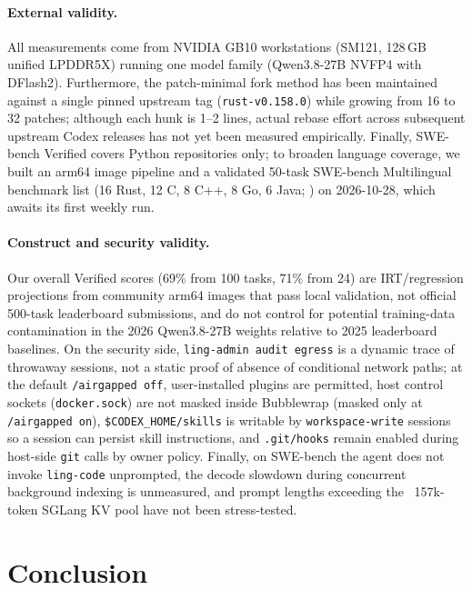 \documentclass[11pt]{article}
\newcommand{\code}[1]{\texttt{#1}}
\begin{document}
\paragraph{External validity.}
All measurements come from NVIDIA GB10 workstations (SM121, 128\,GB unified LPDDR5X) running one
model family (Qwen3.8-27B NVFP4 with DFlash2). Furthermore, the patch-minimal fork method has been
maintained against a single pinned upstream tag (\code{rust-v0.158.0}) while growing from 16 to 32
patches; although each hunk is 1--2 lines, actual rebase effort across subsequent upstream Codex
releases has not yet been measured empirically. Finally, SWE-bench Verified covers Python
repositories only; to broaden language coverage, we built an arm64 image pipeline and a validated
50-task SWE-bench Multilingual benchmark list (16 Rust, 12 C, 8 C++, 8 Go, 6 Java;
) on 2026-10-28, which awaits its first weekly run.

\paragraph{Construct and security validity.}
Our overall Verified scores (69\% from 100 tasks, 71\% from 24) are IRT/regression projections
from community arm64 images that pass local validation, not official 500-task leaderboard
submissions, and do not control for potential training-data contamination in the 2026 Qwen3.8-27B
weights relative to 2025 leaderboard baselines. On the security side, \code{ling-admin audit
egress} is a dynamic trace of throwaway sessions, not a static proof of absence of conditional
network paths; at the default \code{/airgapped off}, user-installed plugins are permitted, host
control sockets (\code{docker.sock}) are not masked inside Bubblewrap (masked only at
\code{/airgapped on}), \code{\$CODEX\_HOME/skills} is writable by \code{workspace-write} sessions
so a session can persist skill instructions, and \code{.git/hooks} remain enabled during host-side
\code{git} calls by owner policy. Finally, on SWE-bench the agent does not invoke \code{ling-code}
unprompted, the decode slowdown during concurrent background indexing is unmeasured, and prompt
lengths exceeding the ~157k-token SGLang KV pool have not been stress-tested.

\section{Conclusion}
\end{document}
